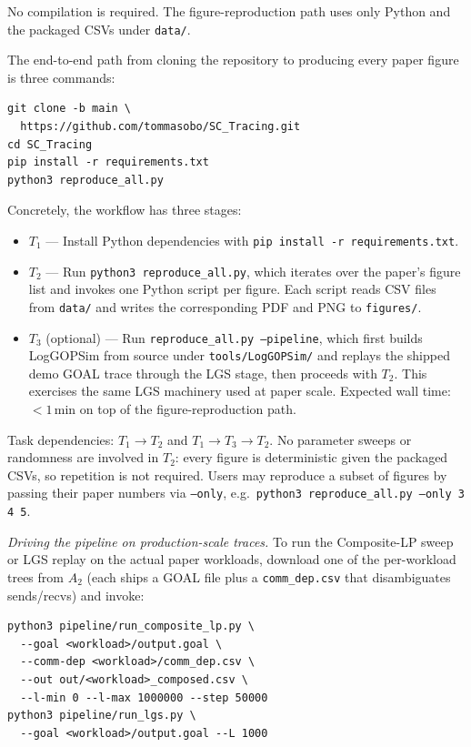 \documentclass[conference]{IEEEtran}
\begin{document}
No compilation is required. The figure-reproduction path uses
only Python and the packaged CSVs under \texttt{data/}.

\artcomp

The end-to-end path from cloning the repository to producing
every paper figure is three commands:

\begingroup\small
\begin{verbatim}
git clone -b main \
  https://github.com/tommasobo/SC_Tracing.git
cd SC_Tracing
pip install -r requirements.txt
python3 reproduce_all.py
\end{verbatim}
\endgroup

Concretely, the workflow has three stages:

\begin{itemize}
\item $T_1$ --- Install Python dependencies with
  \texttt{pip install -r requirements.txt}.
\item $T_2$ --- Run \texttt{python3 reproduce\_all.py}, which
  iterates over the paper's figure list and invokes one Python
  script per figure. Each script reads CSV files from
  \texttt{data/} and writes the corresponding PDF and PNG to
  \texttt{figures/}.
\item $T_3$ (optional) --- Run
  \texttt{reproduce\_all.py --pipeline}, which first builds
  LogGOPSim from source under \texttt{tools/LogGOPSim/} and
  replays the shipped demo GOAL trace through the LGS stage,
  then proceeds with $T_2$. This exercises the same LGS
  machinery used at paper scale. Expected wall time: ${<}1$\,min
  on top of the figure-reproduction path.
\end{itemize}

Task dependencies: $T_1 \rightarrow T_2$ and $T_1 \rightarrow T_3
\rightarrow T_2$. No parameter sweeps or randomness are involved
in $T_2$: every figure is deterministic given the packaged CSVs,
so repetition is not required. Users may reproduce a subset of
figures by passing their paper numbers via \texttt{--only}, e.g.\
\texttt{python3 reproduce\_all.py --only 3 4 5}.

\emph{Driving the pipeline on production-scale traces.} To run the
Composite-LP sweep or LGS replay on the actual paper workloads,
download one of the per-workload trees from $A_2$ (each ships a
GOAL file plus a \texttt{comm\_dep.csv} that disambiguates
sends/recvs) and invoke:

\begingroup\small
\begin{verbatim}
python3 pipeline/run_composite_lp.py \
  --goal <workload>/output.goal \
  --comm-dep <workload>/comm_dep.csv \
  --out out/<workload>_composed.csv \
  --l-min 0 --l-max 1000000 --step 50000
python3 pipeline/run_lgs.py \
  --goal <workload>/output.goal --L 1000
\end{verbatim}
\endgroup
\end{document}
